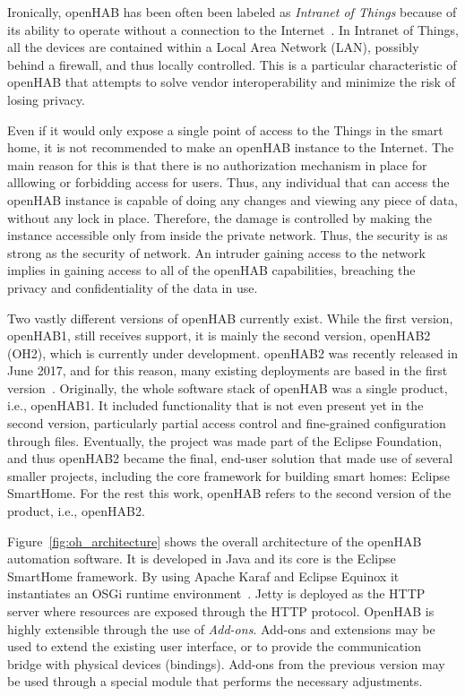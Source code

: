 \documentclass[12pt]{article}
\begin{document}
Ironically, openHAB has been often been labeled as \emph{Intranet of Things} because of its ability to operate without a connection to the Internet~\cite{openhab_03}. In Intranet of Things, all the devices are contained within a Local Area Network (LAN), possibly behind a firewall, and thus locally controlled. This is a particular characteristic of openHAB that attempts to solve vendor interoperability and minimize the risk of losing privacy.

Even if it would only expose a single point of access to the Things in the smart home, it is not recommended to make an openHAB instance to the Internet. The main reason for this is that there is no authorization mechanism in place for alllowing or forbidding access for users. Thus, any individual that can access the openHAB instance is capable of doing any changes and viewing any piece of data, without any lock in place. Therefore, the damage is controlled by making the instance accessible only from inside the private network. Thus, the security is as strong as the security of network. An intruder gaining access to the network implies in gaining access to all of the openHAB capabilities, breaching the privacy and confidentiality of the data in use. 

Two vastly different versions of openHAB currently exist. While the first version, openHAB1, still receives support, it is mainly the second version, openHAB2 (OH2), which is currently under development. openHAB2 was recently released in June 2017, and for this reason, many existing deployments are based in the first version~\cite{openhab_01}. Originally, the whole software stack of openHAB was a single product, i.e., openHAB1. It included functionality that is not even present yet in the second version, particularly partial access control and fine-grained configuration through files. Eventually, the project was made part of the Eclipse Foundation, and thus openHAB2 became the final, end-user solution that made use of several smaller projects, including the core framework for building smart homes: Eclipse SmartHome. For the rest this work, openHAB refers to the second version of the product, i.e., openHAB2.

Figure~\ref{fig:oh_architecture} shows the overall architecture of the openHAB automation software. It is developed in Java and its core is the Eclipse SmartHome framework. By using Apache Karaf and Eclipse Equinox it instantiates an OSGi runtime environment~\cite{openhab_02}. Jetty is deployed as the HTTP server where resources are exposed through the HTTP protocol. OpenHAB is highly extensible through the use of \emph{Add-ons}. Add-ons and extensions may be used to extend the existing user interface, or to provide the communication bridge with physical devices (bindings). Add-ons from the previous version may be used through a special module that performs the necessary adjustments. 
\end{document}
